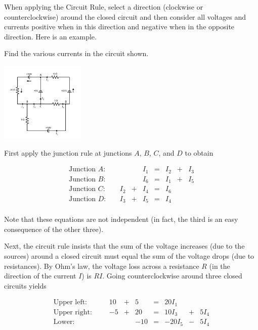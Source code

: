\documentclass{ximera}
\begin{document}
When applying the Circuit Rule, select a direction (clockwise or counterclockwise) around the closed circuit and then consider all voltages and currents positive when in this direction
and negative when in the opposite direction. %
Here is an example.

\begin{example}\label{001817}

Find the various currents in the circuit shown.

\begin{image}
   
\includegraphics[height=1.5in]{circuit1.jpg}~
 
\end{image}

\begin{explanation}
  First apply the junction rule at junctions $A$, $B$, $C$, and $D$ to obtain


$$\begin{array}{lccccccc}
	\mbox{Junction } A:\quad &&& I_1 & = & I_2 &+& I_3 \\
	\mbox{Junction } B:\quad &&& I_6 & = & I_1 &+& I_5 \\
	\mbox{Junction } C:\quad & I_2 &+& I_4 & = & I_6 && \\
	\mbox{Junction } D:\quad & I_3 &+& I_5 & = & I_4&& \\
\end{array}$$

Note that these equations are not independent (in fact, the third is an easy consequence of the other three).

Next, the circuit rule insists that the sum of the voltage increases (due to the sources) around a closed circuit must equal the sum of the voltage drops (due to resistances). By Ohm's law, the voltage loss across a resistance $R$ (in the direction of the current $I$) is $RI$. Going counterclockwise around three closed circuits yields

$$\begin{array}{lcccccccc}
	\mbox{Upper left: } \quad\quad  &10 & + & 5 & = & 20I_1 && \\
	\mbox{Upper right: } &-5 & +& 20 & = & 10I_3& +& 5I_4 \\
	\mbox{Lower: } && &-10 & = & -20I_5 &-& 5I_4 \\
\end{array}$$


\end{explanation}
\end{example}
\end{document}
